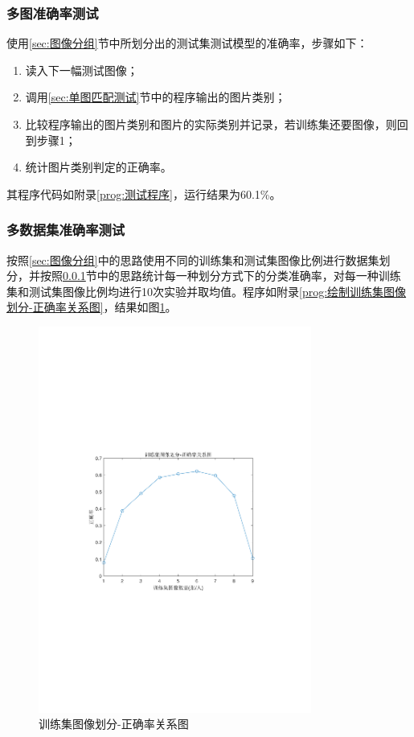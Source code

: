 \documentclass[a4paper]{ctexart}
\begin{document}
\subsubsection{多图准确率测试}\label{sec:多图准确率测试}
使用\ref{sec:图像分组}节中所划分出的测试集测试模型的准确率，步骤如下：
\begin{enumerate}[label=\arabic*、]
	\item 读入下一幅测试图像；
	\item 调用\ref{sec:单图匹配测试}节中的程序输出的图片类别；
	\item 比较程序输出的图片类别和图片的实际类别并记录，若训练集还要图像，则回到步骤1；
	\item 统计图片类别判定的正确率。
\end{enumerate}
其程序代码如附录\ref{prog:测试程序}，运行结果为60.1\%。

\subsubsection{多数据集准确率测试}
按照\ref{sec:图像分组}中的思路使用不同的训练集和测试集图像比例进行数据集划分，并按照\ref{sec:多图准确率测试}节中的思路统计每一种划分方式下的分类准确率，对每一种训练集和测试集图像比例均进行10次实验并取均值。程序如附录\ref{prog:绘制训练集图像划分-正确率关系图}，结果如图\ref{figure:训练集图像划分-正确率关系图}。
\begin{figure}[htbp]
	\centering
	\includegraphics[width=0.8\textwidth]{figure/3.pdf}
	\caption{训练集图像划分-正确率关系图}\label{figure:训练集图像划分-正确率关系图}
\end{figure}
\end{document}

